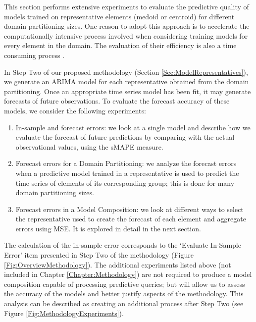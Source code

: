 This section performs extensive experiments to evaluate the predictive quality of models trained on representative elements (medoid or centroid) for different domain partitioning sizes. One reason to adopt this approach is to accelerate the computationally intensive process involved when considering training models for every element in the domain. The evaluation of their efficiency is also a time consuming process \cite{Hyndman2018}.

In Step Two of our proposed methodology (Section \ref{Sec:ModelRepresentatives}), we generate an ARIMA model for each representative obtained from the domain partitioning. Once an appropriate time series model has been fit, it may generate forecasts of future observations. To evaluate the forecast accuracy of these models, we consider the following experiments:

\begin{enumerate}
    \item In-sample and forecast errors: we look at a single model and describe how we evaluate the forecast of future predictions by comparing with the actual observational values, using the sMAPE measure.
    \item Forecast errors for a Domain Partitioning: we analyze the forecast errors when a predictive model trained in a representative is used to predict the time series of elements of its corresponding group; this is done for many domain partitioning sizes.
    \item Forecast errors in a Model Composition: we look at different ways to select the representative used to create the forecast of each element and aggregate errors using MSE. It is explored in detail in the next section.
\end{enumerate}

The calculation of the in-sample error corresponds to the `Evaluate In-Sample Error' item presented in Step Two of the methodology (Figure \ref{Fig:OverviewMethodology}). The additional experiments listed above (not included in Chapter \ref{Chapter:Methodology}) are not required to produce a model composition capable of processing predictive queries; but will allow us to assess the accuracy of the models and better justify aspects of the methodology. This analysis can be described as creating an additional process after Step Two (see Figure \ref{Fig:MethodologyExperiments}). 

